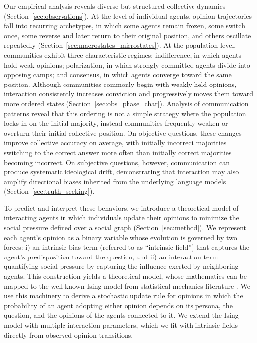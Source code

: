 Our empirical analysis reveals diverse but structured collective dynamics (Section~\ref{sec:observations}). At the level of individual agents, opinion trajectories fall into recurring archetypes, in which some agents remain frozen, some switch once, some reverse and later return to their original position, and others oscillate repeatedly (Section~\ref{sec:macrostates_microstates}). At the population level, communities exhibit three characteristic regimes: indifference, in which agents hold weak opinions; polarization, in which strongly committed agents divide into opposing camps; and consensus, in which agents converge toward the same position. Although communities commonly begin with weakly held opinions, interaction consistently increases conviction and progressively moves them toward more ordered states (Section~\ref{sec:obs_phase_char}). Analysis of communication patterns reveal that this ordering is not a simple strategy where the population locks in on the initial majority, instead communities frequently weaken or overturn their initial collective position. On objective questions, these changes improve collective accuracy on average, with initially incorrect majorities switching to the correct answer more often than initially correct majorities becoming incorrect. On subjective questions, however, communication can produce systematic ideological drift, demonstrating that interaction may also amplify directional biases inherited from the underlying language models (Section~\ref{sec:truth_seeking}).




To predict and interpret these behaviors, we introduce a theoretical model of interacting agents in which individuals update their opinions to minimize the social pressure defined over a social graph (Section~\ref{sec:method}). We represent each agent's opinion as a binary variable whose evolution is governed by two forces: i) an intrinsic bias term (referred to as ``intrinsic field'') that captures the agent's predisposition toward the question, and ii) an interaction term quantifying social pressure by capturing the influence exerted by neighboring agents. This construction yields a theoretical model, whose mathematics can be mapped to the well-known Ising model from statistical mechanics literature \citep{ising1925,glauber1963}. We use this machinery to derive a stochastic update rule for opinions in which the probability of an agent adopting either opinion depends on its persona, the question, and the opinions of the agents connected to it. We extend the Ising model with multiple interaction parameters, which we fit with intrinsic fields directly from observed opinion transitions.


